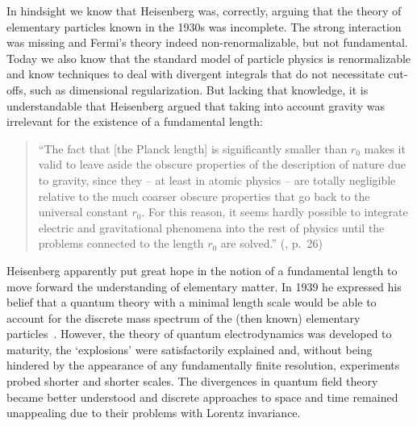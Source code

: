 \documentclass{article}
\begin{document}
In hindsight we know that Heisenberg was,
correctly, arguing that the theory of elementary particles known in the 1930s was
incomplete. The strong interaction was missing and Fermi's theory indeed non-renormalizable,
but not fundamental. Today we also know that the standard model of particle physics
is renormalizable and know techniques to deal with divergent integrals that do not
necessitate cut-offs, such as dimensional regularization. But lacking that knowledge, it
is understandable that Heisenberg argued that taking into account gravity was irrelevant
for the existence of a fundamental length:
%
\begin{quote}
``The fact that [the Planck length] is significantly smaller than
  $r_0$ makes it valid to leave aside the obscure properties of the
  description of nature due to gravity, since they -- at least in
  atomic physics -- are totally negligible relative to the much
  coarser obscure properties that go back to the universal constant
  $r_0$. For this reason, it seems hardly possible to integrate
  electric and gravitational phenomena into the rest of physics until
  the problems connected to the length $r_0$ are solved.''%
  (\cite{Heisenberg1}, p.~26)
\end{quote}
%
Heisenberg apparently put great hope in the notion of a fundamental length to move forward the
understanding of elementary matter. In 1939 he expressed his belief that a quantum theory with a
minimal length scale would be able to account for the discrete mass spectrum of the (then known)
elementary particles~\cite{Heisenberg39}.
However, the theory of quantum electrodynamics was developed to maturity, the `explosions' were satisfactorily
explained and, without being hindered by the appearance of any fundamentally finite resolution, experiments
probed shorter and shorter scales. The divergences in quantum field theory became better
understood and discrete approaches to space and time remained unappealing due to their problems with
Lorentz invariance.
\end{document}
